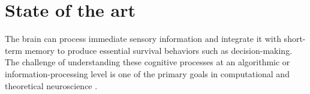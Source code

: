 \documentclass[12pt,letterpaper, onecolumn]{article}
\theoremstyle{definition}
\theoremstyle{remark}
\begin{document}

\newpage
\section{State of the art}

The brain can process immediate sensory information and integrate it with short-term memory to produce essential survival behaviors such as decision-making.
The challenge of understanding these cognitive processes at an algorithmic or information-processing level is one of the primary goals in computational and theoretical neuroscience \citep{dyer2023simplest}. %
\end{document}
